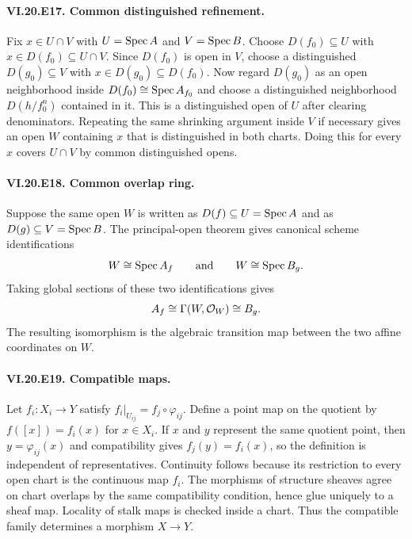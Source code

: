 \paragraph{VI.20.E17. Common distinguished refinement.}
\begin{solution}
Fix $x\in U\cap V$ with $U=\operatorname{Spec} A$ and $V=\operatorname{Spec} B$.  Choose $D(f_0)\subseteq U$ with $x\in D(f_0)\subseteq U\cap V$.  Since $D(f_0)$ is open in $V$, choose a distinguished $D(g_0)\subseteq V$ with $x\in D(g_0)\subseteq D(f_0)$.  Now regard $D(g_0)$ as an open neighborhood inside $D(f_0)\cong\operatorname{Spec} A_{f_0}$ and choose a distinguished neighborhood $D(h/f_0^n)$ contained in it.  This is a distinguished open of $U$ after clearing denominators.  Repeating the same shrinking argument inside $V$ if necessary gives an open $W$ containing $x$ that is distinguished in both charts.  Doing this for every $x$ covers $U\cap V$ by common distinguished opens.
\end{solution}

\paragraph{VI.20.E18. Common overlap ring.}
\begin{solution}
Suppose the same open $W$ is written as $D(f)\subseteq U=\operatorname{Spec} A$ and as $D(g)\subseteq V=\operatorname{Spec} B$.  The principal-open theorem gives canonical scheme identifications
\[
W\cong\operatorname{Spec} A_f\qquad\text{and}\qquad W\cong\operatorname{Spec} B_g.
\]
Taking global sections of these two identifications gives
\[
A_f\cong\Gamma(W,\mathcal O_W)\cong B_g.
\]
The resulting isomorphism is the algebraic transition map between the two affine coordinates on $W$.
\end{solution}

\paragraph{VI.20.E19. Compatible maps.}
\begin{solution}
Let $f_i:X_i\to Y$ satisfy $f_i|_{U_{ij}}=f_j\circ\varphi_{ij}$.  Define a point map on the quotient by $f([x])=f_i(x)$ for $x\in X_i$.  If $x$ and $y$ represent the same quotient point, then $y=\varphi_{ij}(x)$ and compatibility gives $f_j(y)=f_i(x)$, so the definition is independent of representatives.  Continuity follows because its restriction to every open chart is the continuous map $f_i$.  The morphisms of structure sheaves agree on chart overlaps by the same compatibility condition, hence glue uniquely to a sheaf map.  Locality of stalk maps is checked inside a chart.  Thus the compatible family determines a morphism $X\to Y$.
\end{solution}

